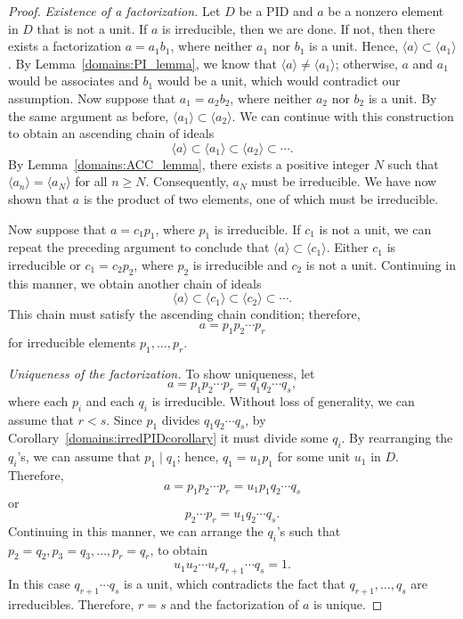 \begin{proof}
{\em Existence of a factorization.}
Let $D$ be a PID and $a$ be a nonzero element in $D$ that is not a
unit. If $a$ is irreducible, then we are done. If not, then there
exists a factorization $a = a_1 b_1$, where neither $a_1$ nor $b_1$ is
a unit. Hence, $\langle a \rangle \subset \langle a_1 \rangle$. By
Lemma~\ref{domains:PI_lemma}, we know that $\langle a \rangle \neq \langle a_1 \rangle$;
otherwise, $a$ and $a_1$ would be associates and $b_1$ would be a unit,
which would contradict our assumption. Now suppose that $a_1 =  a_2
b_2$, where neither $a_2$ nor $b_2$ is a unit. By the same argument as
before, $\langle a_1 \rangle \subset \langle a_2 \rangle$.  We can
continue with this construction to obtain an ascending chain of ideals
\[
\langle a \rangle \subset \langle a_1 \rangle \subset \langle a_2
\rangle \subset \cdots.
\]
By Lemma~\ref{domains:ACC_lemma}, there exists a positive integer $N$ such that
$\langle a_n \rangle = \langle a_N \rangle$ for all $n \geq N$. 
Consequently, $a_N$ must be irreducible. We have now shown that $a$ is
the product of two elements, one of which must be irreducible.  



Now suppose that $a = c_1 p_1$, where $p_1$ is irreducible. If $c_1$
is not a unit, we can repeat the preceding argument to conclude that
$\langle a \rangle \subset \langle c_1 \rangle$. Either $c_1$ is
irreducible or $c_1 = c_2 p_2$, where $p_2$ is irreducible and $c_2$
is not a unit.  Continuing in this manner, we obtain another chain of
ideals
\[
\langle a \rangle \subset \langle c_1 \rangle \subset \langle c_2
\rangle \subset \cdots.	   
\]
This chain must satisfy the ascending chain condition; therefore, 
\[
a = p_1 p_2 \cdots p_r
\]
for irreducible elements $p_1, \ldots, p_r$.


{\em Uniqueness of the factorization.}
To show uniqueness, let
\[
a= p_1 p_2 \cdots p_r = q_1 q_2 \cdots q_s,
\]
where each $p_i$ and each $q_i$ is irreducible.  Without loss of
generality, we can assume that $r < s$. Since $p_1$ divides $q_1 q_2
\cdots q_s$, by Corollary~\ref{domains:irredPIDcorollary} it must divide some $q_i$. By
rearranging the $q_i$'s, we can assume that $p_1 \mid q_1$; hence,
$q_1 = u_1 p_1$ for some unit $u_1$ in $D$. Therefore,
\[
a = p_1 p_2 \cdots p_r = u_1 p_1 q_2 \cdots q_s
\]
or 
\[
p_2 \cdots p_r = u_1 q_2 \cdots q_s.
\]
Continuing in this manner, we can arrange the $q_i$'s such that $p_2
= q_2, p_3 = q_3, \ldots, p_r = q_r$, to obtain
\[
u_1 u_2 \cdots u_r q_{r+1} \cdots q_s = 1.
\]
In this case $q_{r+1} \cdots q_s$ is a unit, which contradicts the
fact that $q_{r+1}, \ldots, q_s$ are irreducibles. Therefore, $r=s$
and the factorization of $a$ is unique.
\end{proof}

